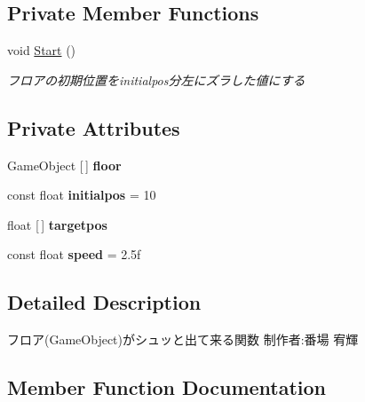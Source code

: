 \subsection*{Private Member Functions}
\begin{DoxyCompactItemize}
\item 
void \hyperlink{class_floor_move_obj_a59c1e0eb2b520cc42ad34159eacb9e32}{Start} ()
\begin{DoxyCompactList}\small\item\em フロアの初期位置をinitialpos分左にズラした値にする \end{DoxyCompactList}\end{DoxyCompactItemize}
\subsection*{Private Attributes}
\begin{DoxyCompactItemize}
\item 
\mbox{\label{class_floor_move_obj_a24516bd2aa1b359d7d6004262ae1ef9e}} 
Game\+Object \mbox{[}$\,$\mbox{]} {\bfseries floor}
\item 
\mbox{\label{class_floor_move_obj_ac37370cc720066e141a7b30f569ccbf5}} 
const float {\bfseries initialpos} = 10
\item 
\mbox{\label{class_floor_move_obj_ada6be5710a08f663acdce9c7dd53771c}} 
float \mbox{[}$\,$\mbox{]} {\bfseries targetpos}
\item 
\mbox{\label{class_floor_move_obj_a8d900a86ea074b20586b3bcadad5902b}} 
const float {\bfseries speed} = 2.\+5f
\end{DoxyCompactItemize}


\subsection{Detailed Description}
フロア(\+Game\+Object)がシュッと出て来る関数 制作者\+:番場 宥輝 



\subsection{Member Function Documentation}
\mbox{\label{class_floor_move_obj_a66592e739e390e7bd43c0d73e112577c}} 
